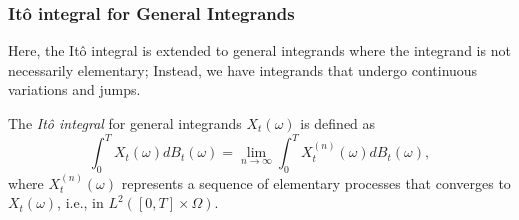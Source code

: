 \subsubsection{It\^{o} integral for General Integrands}
Here, the It\^{o} integral is extended to general integrands where the integrand is not necessarily elementary; Instead, we have
integrands that undergo continuous variations and jumps\cite{shreve_2004_stochastic2}.
\begin{definition}
    The \textit{It\^{o} integral} for general integrands $X_t(\omega)$ is defined as
    \begin{equation}
        \int_0^T X_t(\omega) dB_t(\omega) = \lim_{n \to \infty} \int_0^T X_{t}^{(n)}(\omega) dB_t(\omega),
    \end{equation}
    where $X_{t}^{(n)}(\omega)$ represents a sequence of elementary processes that converges to $X_t(\omega)$, i.e., in $L^2([0,T] \times \Omega).$
\end{definition}






